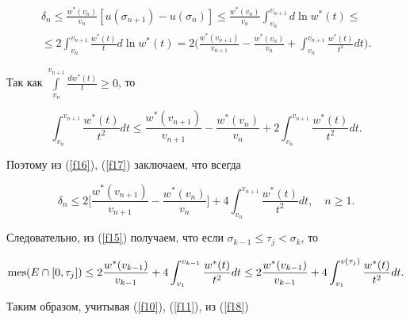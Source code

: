 \begin{multline}\label{f17}


\delta_{n}\leq\frac{w^{*}(v_{n})}{v_{n}}[u(\sigma_{n+1})-u(\sigma_{n})]\leq


\frac{w^{*}(v_{n})}{v_{n}}\int_{v_{n}}^{v_{n+1}}d\ln w^{*}(t)\leq \\


%


\leq 2\int_{v_{n}}^{v_{n+1}}\frac{w^{*}(t)}{t}d \ln w^{*}(t)


=2 \bigg(\frac{w^{*}(v_{n+1})}{v_{n+1}} - \frac{w^{*}(v_{n})}{v_{n}} +


\int_{v_{n}}^{v_{n+1}}\frac{w^{*}(t)}{t^{2}}dt\bigg).


\end{multline}


Так как $\int\limits_{v_{n}}^{v_{n+1}}\frac{dw^{*}(t)}{t}\geq 0$, то


$$


\int_{v_{n}}^{v_{n+1}}\frac{w^{*}(t)}{t^{2}}dt\leq


\frac{w^{*}(v_{n+1})}{v_{n+1}} - \frac{w^{*}(v_{n})}{v_{n}} +


2\int_{v_{n}}^{v_{n+1}}\frac{w^{*}(t)}{t^{2}}dt.


$$


Поэтому из (\ref{f16}), (\ref{f17}) заключаем, что всегда


$$


\delta_{n}\leq 2\bigg[\frac{w^{*}(v_{n+1})}{v_{n+1}} -


\frac{w^{*}(v_{n})}{v_{n}}\bigg]+


4\int_{v_{n}}^{v_{n+1}}\frac{w^{*}(t)}{t^{2}}dt, \quad n\geq 1.


$$


Следовательно, из (\ref{f15}) получаем, что если $\sigma_{k-1}\leq


\tau_{j}<\sigma_{k}$, то


\begin{equation}\label{f18}


\mes(E\cap[0,\tau_{j}])\leq 2\frac{w^{*}(v_{k-1})}{v_{k-1}}+


4\int_{v_{1}}^{v_{k-1}}\frac{w^{*}(t)}{t^{2}}dt\leq 


%


2\frac{w^{*}(v_{k-1})}{v_{k-1}}+


4\int_{v_{1}}^{v(\tau_{j})}\frac{w^{*}(t)}{t^{2}}dt.


\end{equation}


Таким образом, учитывая (\ref{f10}), (\ref{f11}), из (\ref{f18})


